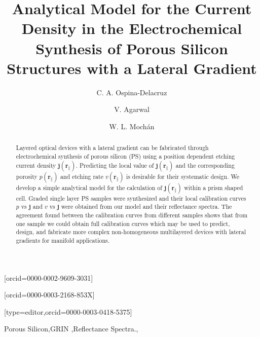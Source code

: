 \documentclass[review,sort&compress]{cas-sc}
\begin{document}
\title[mode=title]{Analytical Model for the Current Density in
the Electrochemical Synthesis of Porous Silicon Structures with a
Lateral Gradient}
\author[1]{C. A. Ospina-Delacruz}[orcid=0000-0002-9609-3031]
\author[1,2]{V. Agarwal}[orcid=0000-0003-2168-853X]
\fnmark[1]
\author[2]{W. L. Mochán}[type=editor,orcid=0000-0003-0418-5375]
\cormark[1]
\address[1]{Centro de
  Investigación en Ingeniería y Ciencias Aplicadas (CIICAp-IICBA),
  Universidad Autónoma del Estado de Morelos (UAEM), Cuernavaca CP
  62209, México}
\address[2]{Instituto de Ciencias F\'isicas, Universidad Nacional
  Autonóma de México, Av. Universidad S/N, Col. Chamilpa, 62210
  Cuernavaca, Morelos, México}
\begin{keywords}
  Porous Silicon\sep GRIN \sep Reflectance Spectra.\sep
\end{keywords}
\maketitle
\begin{abstract}
  Layered optical devices with a lateral gradient
  can be fabricated through electrochemical synthesis of
  porous silicon (PS) using a position dependent etching current
  density  $\bm j(\bm r_\|)$. Predicting the local
  value of $\bm j(\bm r_\|)$ and the corresponding porosity
  $p(\bm r_\|)$ and etching rate $v(\bm r_\|)$ is desirable for their
  systematic design.
  We develop a simple analytical model for the
  calculation of $\bm j(\bm r_\|)$ within a prism shaped
  cell. Graded single layer PS samples
  were synthesized and their local calibration curves $p$ vs $\bm j$ and $v$
  vs $\bm j$ were obtained from our model and their reflectance spectra.
  The agreement found between the calibration curves from
  different samples shows that from one sample we
  could obtain full calibration curves which may be
  used to predict, design, and fabricate more complex
  non-homogeneous multilayered devices with lateral gradients for
  manifold applications.
\end{abstract}
\end{document}
